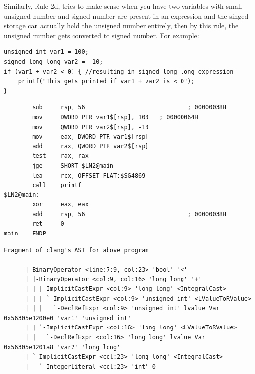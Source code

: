 \documentclass{article}
\begin{document}
Similarly, Rule 2d, tries to make sense when you have two variables with small
unsigned number and signed number are present in an expression and the
singed storage can actually hold the unsigned number entirely, then by this
rule, the unsigned number gets converted to signed number.
For example:
\begin{verbatim}
unsigned int var1 = 100;
signed long long var2 = -10;
if (var1 + var2 < 0) { //resulting in signed long long expression
    printf("This gets printed if var1 + var2 is < 0");
}
\end{verbatim}
\begin{verbatim}
        sub     rsp, 56                             ; 00000038H
        mov     DWORD PTR var1$[rsp], 100   ; 00000064H
        mov     QWORD PTR var2$[rsp], -10
        mov     eax, DWORD PTR var1$[rsp]
        add     rax, QWORD PTR var2$[rsp]
        test    rax, rax
        jge     SHORT $LN2@main
        lea     rcx, OFFSET FLAT:$SG4869
        call    printf
$LN2@main:
        xor     eax, eax
        add     rsp, 56                             ; 00000038H
        ret     0
main    ENDP
\end{verbatim}
\begin{verbatim}
Fragment of clang's AST for above program

      |-BinaryOperator <line:7:9, col:23> 'bool' '<'
      | |-BinaryOperator <col:9, col:16> 'long long' '+'
      | | |-ImplicitCastExpr <col:9> 'long long' <IntegralCast>
      | | | `-ImplicitCastExpr <col:9> 'unsigned int' <LValueToRValue>
      | | |   `-DeclRefExpr <col:9> 'unsigned int' lvalue Var 0x56305e1200e0 'var1' 'unsigned int'
      | | `-ImplicitCastExpr <col:16> 'long long' <LValueToRValue>
      | |   `-DeclRefExpr <col:16> 'long long' lvalue Var 0x56305e1201a8 'var2' 'long long'
      | `-ImplicitCastExpr <col:23> 'long long' <IntegralCast>
      |   `-IntegerLiteral <col:23> 'int' 0
\end{verbatim}
\end{document}
